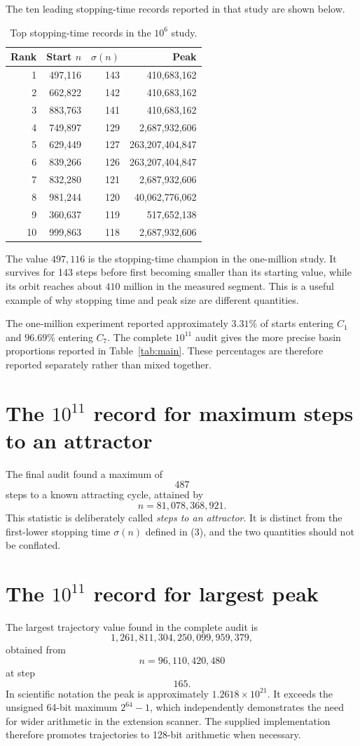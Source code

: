 \documentclass[11pt]{article}
\begin{document}
The ten leading stopping-time records reported in that study are shown below.

\begin{table}[h]
\centering
\caption{Top stopping-time records in the $10^6$ study.}
\begin{tabular}{rrrr}
\toprule
Rank & Start $n$ & $\sigma(n)$ & Peak\\
\midrule
1 & 497,116 & 143 & 410,683,162\\
2 & 662,822 & 142 & 410,683,162\\
3 & 883,763 & 141 & 410,683,162\\
4 & 749,897 & 129 & 2,687,932,606\\
5 & 629,449 & 127 & 263,207,404,847\\
6 & 839,266 & 126 & 263,207,404,847\\
7 & 832,280 & 121 & 2,687,932,606\\
8 & 981,244 & 120 & 40,062,776,062\\
9 & 360,637 & 119 & 517,652,138\\
10 & 999,863 & 118 & 2,687,932,606\\
\bottomrule
\end{tabular}
\end{table}

The value $497,116$ is the stopping-time champion in the one-million study. It survives for 143 steps before first becoming smaller than its starting value, while its orbit reaches about $410$ million in the measured segment. This is a useful example of why stopping time and peak size are different quantities.

The one-million experiment reported approximately $3.31\%$ of starts entering $C_1$ and $96.69\%$ entering $C_7$. The complete $10^{11}$ audit gives the more precise basin proportions reported in Table~\ref{tab:main}. These percentages are therefore reported separately rather than mixed together.

\section{The $10^{11}$ record for maximum steps to an attractor}
The final audit found a maximum of
\[
487
\]
steps to a known attracting cycle, attained by
\[
n=81,078,368,921.
\]
This statistic is deliberately called \emph{steps to an attractor}. It is distinct from the first-lower stopping time $\sigma(n)$ defined in (3), and the two quantities should not be conflated.

\section{The $10^{11}$ record for largest peak}
The largest trajectory value found in the complete audit is
\[
1,261,811,304,250,099,959,379,
\]
obtained from
\[
n=96,110,420,480
\]
at step
\[
165.
\]
In scientific notation the peak is approximately $1.2618\times10^{21}$. It exceeds the unsigned 64-bit maximum $2^{64}-1$, which independently demonstrates the need for wider arithmetic in the extension scanner. The supplied implementation therefore promotes trajectories to 128-bit arithmetic when necessary.
\end{document}
